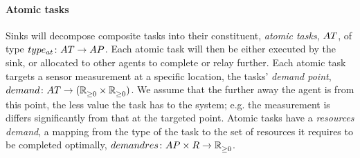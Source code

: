 \paragraph{Atomic tasks}
\label{section:problem:atomic_tasks}
Sinks will decompose composite tasks into their constituent, \textit{atomic tasks}, $\setAtomicTask{}{}$, of type $\formalAtomicTaskType{}{}$. Each atomic task will then be either executed by the sink, or allocated to other agents to complete or relay further. Each atomic task targets a sensor measurement at a specific location, the tasks' \textit{demand point}, $\formalTaskDemandPoint{}{}$. We assume that the further away the agent is from this point, the less value the task has to the system; e.g. the measurement is differs significantly from that at the targeted point. Atomic tasks have a \textit{resources demand}, a mapping from the type of the task to the set of resources it requires to be completed optimally, $\formalRequiredResources{}{}$. 

